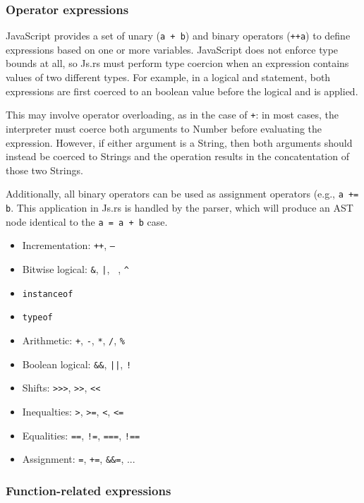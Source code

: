 \documentclass{article}
\begin{document}
\begin{multicols}{2}
\subsubsection*{Operator expressions}

JavaScript provides a set of unary (\texttt{a + b}) and binary operators
(\texttt{++a}) to define expressions based on one or more variables. JavaScript
does not enforce type bounds at all, so Js.rs must perform type coercion when an
expression contains values of two different types. For example, in a logical
and statement, both expressions are first coerced to an boolean value before the
logical and is applied.\newline

This may involve operator overloading, as in the case of \texttt{+}: in most cases, the
interpreter must coerce both arguments to Number before evaluating the
expression. However, if either argument is a String, then both
arguments should instead be coerced to Strings and the operation results in the
concatentation of those two Strings. \newline

Additionally, all binary operators can be used as assignment operators (e.g.,
\texttt{a += b}. This application in Js.rs is handled by the parser, which will
produce an AST node identical to the \texttt{a = a + b} case.

\begin{itemize}
  \item Incrementation: \texttt{++}, \texttt{--}
  \item Bitwise logical: \texttt{\&}, \texttt{|}, \texttt{~}, \texttt{\^}
  \item \texttt{instanceof}
  \item \texttt{typeof}
  \item Arithmetic: \texttt{+}, \texttt{-}, \texttt{*}, \texttt{/}, \texttt{\%}
  \item Boolean logical: \texttt{\&\&}, \texttt{||}, \texttt{!}
  \item Shifts: \texttt{>>>}, \texttt{>>}, \texttt{<<}
  \item Inequalties: \texttt{>}, \texttt{>=}, \texttt{<}, \texttt{<=}
  \item Equalities: \texttt{==}, \texttt{!=}, \texttt{===}, \texttt{!==}
  \item Assignment: \texttt{=}, \texttt{+=}, \texttt{\&\&=}, ...
\end{itemize}

\subsubsection*{Function-related expressions}


\end{multicols}
\end{document}
